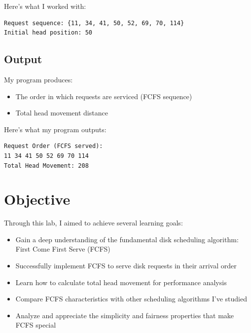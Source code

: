 \documentclass[12pt,a4paper]{article}
\begin{document}
Here's what I worked with:
\begin{verbatim}
Request sequence: {11, 34, 41, 50, 52, 69, 70, 114}
Initial head position: 50
\end{verbatim}

\subsection*{Output}
My program produces:
\begin{itemize}
  \item The order in which requests are serviced (FCFS sequence)
  \item Total head movement distance
\end{itemize}

Here's what my program outputs:
\begin{verbatim}
Request Order (FCFS served):
11 34 41 50 52 69 70 114
Total Head Movement: 208
\end{verbatim}

\section{Objective}
Through this lab, I aimed to achieve several learning goals:
\begin{itemize}
    \item Gain a deep understanding of the fundamental disk scheduling algorithm: First Come First Serve (FCFS)
    \item Successfully implement FCFS to serve disk requests in their arrival order
    \item Learn how to calculate total head movement for performance analysis
    \item Compare FCFS characteristics with other scheduling algorithms I've studied
    \item Analyze and appreciate the simplicity and fairness properties that make FCFS special
\end{itemize}
\end{document}
